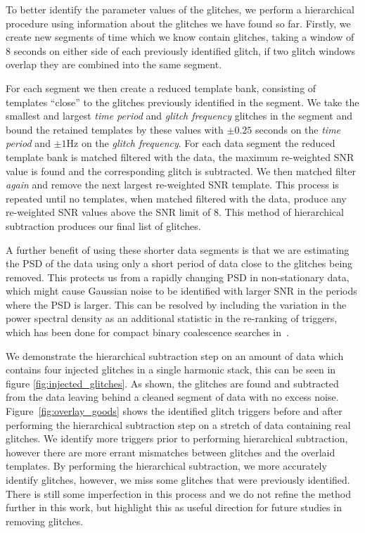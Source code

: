 To better identify the parameter values of the \scl{} glitches, we perform a hierarchical procedure using information about the glitches we have found so far. Firstly, we create new segments of time which we know contain \scl{} glitches, taking a window of $8$ seconds on either side of each previously identified glitch, if two glitch windows overlap they are combined into the same segment.

For each segment we then create a reduced template bank, consisting of templates ``close'' to the \scl{} glitches previously identified in the segment. We take the smallest and largest \emph{time period} and \emph{glitch frequency} glitches in the segment and bound the retained templates by these values with $\pm 0.25$ seconds on the \emph{time period} and $\pm 1$Hz on the \emph{glitch frequency}. For each data segment the reduced template bank is matched filtered with the data, the maximum re-weighted SNR value is found and the corresponding glitch is subtracted. We then matched filter \emph{again} and remove the next largest re-weighted SNR template. This process is repeated until no templates, when matched filtered with the data, produce any re-weighted SNR values above the SNR limit of $8$. This method of hierarchical subtraction produces our final list of \scl{} glitches.

A further benefit of using these shorter data segments is that we are estimating the PSD of the data using only a short period of data close to the \scl{} glitches being removed. This protects us from a rapidly changing PSD in non-stationary data, which might cause Gaussian noise to be identified with larger SNR in the periods where the PSD is larger. This can be resolved by including the variation in the power spectral density as an additional statistic in the re-ranking of triggers, which has been done for compact binary coalescence \gw{} searches in~\cite{Mozzon_2020}.

We demonstrate the hierarchical subtraction step on an amount of data which contains four injected \scl{} glitches in a single harmonic stack, this can be seen in figure \ref{fig:injected_glitches}. As shown, the \scl{} glitches are found and subtracted from the data leaving behind a cleaned segment of \gw{} data with no excess noise. Figure~\ref{fig:overlay_goods} shows the identified \scl{} glitch triggers before and after performing the hierarchical subtraction step on a stretch of data containing real \scl{} glitches. We identify more triggers prior to performing hierarchical subtraction, however there are more errant mismatches between \scl{} glitches and the overlaid templates. By performing the hierarchical subtraction, we more accurately identify \scl{} glitches, however, we miss some glitches that were previously identified. There is still some imperfection in this process and we do not refine the method further in this work, but highlight this as useful direction for future studies in removing \scl{} glitches. 

